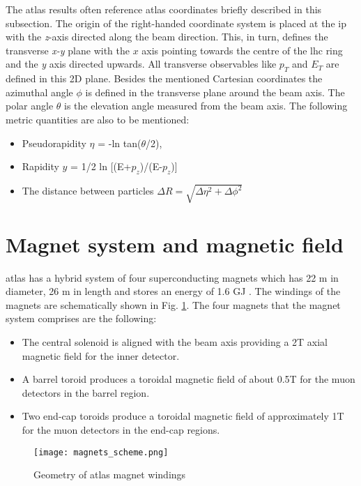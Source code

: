 		The \gls{atlas} results often reference \gls{atlas} coordinates briefly described in this subsection. The origin of the right-handed coordinate system is placed at the \gls{ip} with the \textit{z}-axis directed along the beam direction. This, in turn, defines the transverse \textit{x-y} plane with the $\textit{x}$ axis pointing towards the centre of the \gls{lhc} ring and the \textit{y} axis directed upwards. All transverse observables like $p_T$ and $E_T$ are defined in this 2D plane. Besides the mentioned Cartesian coordinates the azimuthal angle \textit{$\phi$} is defined in the transverse plane around the beam axis. The polar angle \textit{$\theta$} is the elevation angle measured from the beam axis. The following metric quantities are also to be mentioned:
		\begin{itemize}
		\item Pseudorapidity $\eta$ = -ln tan($\theta$/2),
		\item Rapidity $y$ = 1/2 ln [(E+$p_z$)/(E-$p_z$)]
		\item The distance between particles $\Delta R = \sqrt{\Delta \eta^2 + \Delta \phi ^2}$
		\end{itemize}
        
        \section{Magnet system and magnetic field}\label{atlas_magnets}
        \gls{atlas} has a hybrid system of four superconducting magnets which has 22 m in diameter, 26 m in length and stores an energy of 1.6 GJ \cite{magnet_tdr1}. The windings of the magnets are schematically shown in Fig. \ref{fig::atlas_magnets}. The four magnets that the magnet system comprises are the following: 
        		\begin{itemize}
        	\item The central solenoid is aligned with the beam axis providing a 2T axial magnetic field for the inner detector.
        	\item A barrel toroid produces a toroidal magnetic field of about 0.5T for the muon detectors in the barrel region.
        	\item Two end-cap toroids produce a toroidal magnetic field of approximately 1T for the muon detectors in the end-cap regions.
        \end{itemize}
        \begin{figure}[htpb]
        	\centering
        	\texttt{[image: magnets\_scheme.png]}
        	\caption{Geometry of \gls{atlas} magnet windings}
        	\label{fig::atlas_magnets}
        \end{figure}

